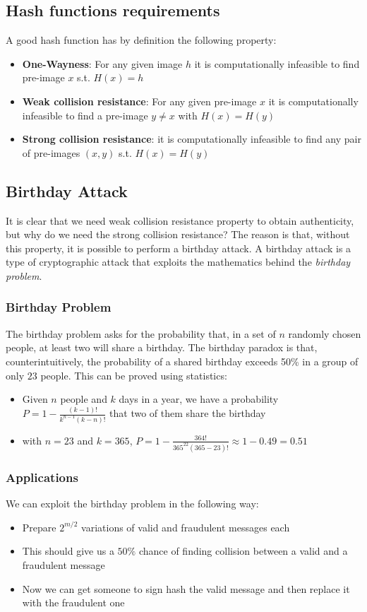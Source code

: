 \subsection{Hash functions requirements}
A good hash function has by definition the following property:
\begin{itemize}
    \item \textbf{One-Wayness}: For any given image $h$ it is computationally infeasible to find pre-image $x$ s.t. $H(x) = h$
    \item \textbf{Weak collision resistance}: For any given pre-image $x$ it is computationally infeasible to find a pre-image $y\neq x$ with $H(x)=H(y)$
    \item \textbf{Strong collision resistance}: it is computationally infeasible to find any pair of pre-images $(x,y)$ s.t. $H(x)=H(y)$
\end{itemize}
\subsection{Birthday Attack}
It is clear that we need weak collision resistance property to obtain authenticity, but why do we need the strong collision resistance? The reason is that, without this property, it is possible to perform a birthday attack. A birthday attack is a type of cryptographic attack that exploits the mathematics behind the \textit{birthday problem}.
\subsubsection{Birthday Problem}
The birthday problem asks for the probability that, in a set of $n$ randomly chosen people, at least two will share a birthday. The birthday paradox is that, counterintuitively, the probability of a shared birthday exceeds 50\% in a group of only $23$ people. This can be proved using statistics:
\begin{itemize}
    \item Given $n$ people and $k$ days in a year, we have a probability\\ $P=1-\frac{(k-1)!}{k^{n-1}(k-n)!}$ that two of them share the birthday
    \item with $n=23$ and $k=365$, $P=1-\frac{364!}{365^{22}(365-23)!}\approx1-0.49=0.51$
\end{itemize}
\subsubsection{Applications}
We can exploit the birthday problem in the following way:
\begin{itemize}
    \item Prepare $2^{m/2}$ variations of valid and fraudulent messages each
    \item This should give us a $50\%$ chance of finding collision between a valid and a fraudulent message
    \item Now we can get someone to sign hash the valid message and then replace it with the fraudulent one
\end{itemize}

